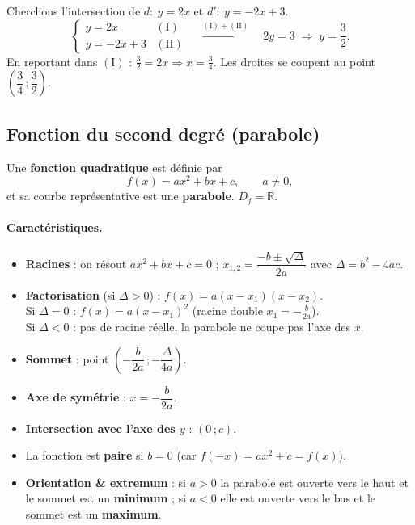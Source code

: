 \documentclass[11pt,a4paper]{article}
\newcommand{\R}{\mathbb{R}}
\newcommand{\Df}{D_f}
\begin{document}
\begin{exemple}
Cherchons l'intersection de $d:\ y=2x$ et $d':\ y=-2x+3$.
\[
  \begin{cases} y=2x & (\mathrm{I})\\ y=-2x+3 & (\mathrm{II}) \end{cases}
  \quad\xrightarrow{(\mathrm{I})+(\mathrm{II})}\quad 2y=3 \;\Rightarrow\; y=\frac32 .
\]
En reportant dans $(\mathrm{I})$ : $\frac32=2x\Rightarrow x=\frac34$.
Les droites se coupent au point $\left(\dfrac34\,;\dfrac32\right)$.
\end{exemple}

\subsection{Fonction du second degré (parabole)}

\begin{definition}
Une \textbf{fonction quadratique} est définie par
\[
  f(x)=ax^2+bx+c,\qquad a\neq 0,
\]
et sa courbe représentative est une \textbf{parabole}. $\Df=\R$.
\end{definition}

\paragraph{Caractéristiques.}
\begin{itemize}[leftmargin=1.5em,topsep=2pt,itemsep=2pt]
  \item \textbf{Racines} : on résout $ax^2+bx+c=0$ ;
        $x_{1,2}=\dfrac{-b\pm\sqrt{\Delta}}{2a}$ avec $\Delta=b^2-4ac$.
  \item \textbf{Factorisation} (si $\Delta>0$) : $f(x)=a(x-x_1)(x-x_2)$.\\
        Si $\Delta=0$ : $f(x)=a(x-x_1)^2$ (racine double $x_1=-\frac{b}{2a}$).\\
        Si $\Delta<0$ : pas de racine réelle, la parabole ne coupe pas l'axe des $x$.
  \item \textbf{Sommet} : point $\left(-\dfrac{b}{2a}\,;-\dfrac{\Delta}{4a}\right)$.
  \item \textbf{Axe de symétrie} : $x=-\dfrac{b}{2a}$.
  \item \textbf{Intersection avec l'axe des $y$} : $(0\,;c)$.
  \item La fonction est \textbf{paire} si $b=0$ (car $f(-x)=a x^2+c=f(x)$).
  \item \textbf{Orientation \& extremum} : si $a>0$ la parabole est ouverte vers le haut et
        le sommet est un \textbf{minimum} ; si $a<0$ elle est ouverte vers le bas et le
        sommet est un \textbf{maximum}.
\end{itemize}
\end{document}
